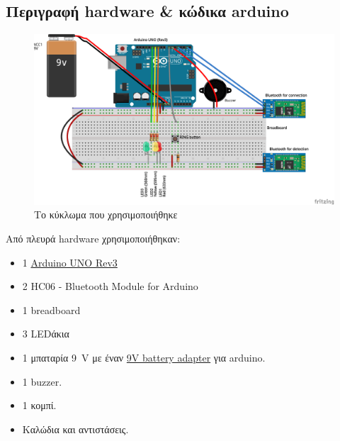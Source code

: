 \subsection{Περιγραφή hardware \& κώδικα arduino}
\renewcommand{\figurename}{Σχήμα}
\begin{figure}[htb]
    \centering
    \includegraphics[keepaspectratio, width=\linewidth]{hardware/sketch_bb}
    \caption{Το κύκλωμα που χρησιμοποιήθηκε}
    \label{fig:hardware}
\end{figure}
Από πλευρά hardware χρησιμοποιήθηκαν:
\begin{itemize}
\item 1 \href{https://www.arduino.cc/en/Main/ArduinoBoardUno}{Arduino UNO Rev3}
\item 2 HC06 - Bluetooth Module for Arduino
\item 1 breadboard
\item 3 LEDάκια
\item 1 μπαταρία \SI{9}{\volt} με έναν \href{http://playground.arduino.cc/Learning/9VBatteryAdapter}{9V battery adapter} για arduino.
\item 1 buzzer.
\item 1 κομπί.
\item Καλώδια και αντιστάσεις.
\end{itemize}

